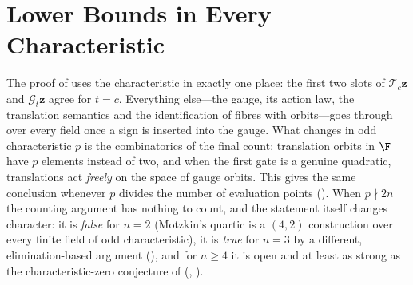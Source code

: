 %

\section{Lower Bounds in Every Characteristic}
\label{sec:lower-charp}

The proof of  uses the characteristic in exactly one place: the
first two slots of $\mathcal T_c\mathbf z$ and $\mathcal G_t\mathbf z$ agree for $t=c$.
Everything else---the gauge, its action law, the translation semantics and the
identification of fibres with orbits---goes through over every field once a sign is
inserted into the gauge.  What changes in odd characteristic $p$ is the combinatorics of
the final count: translation orbits in $\F$ have $p$ elements instead of two, and when the
first gate is a genuine quadratic, translations act \emph{freely} on the space of gauge
orbits.  This gives the same conclusion whenever $p$ divides the number of evaluation
points ().  When $p\nmid 2n$ the counting argument has nothing to
count, and the statement itself changes character: it is \emph{false} for $n=2$ (Motzkin's
quartic is a $(4,2)$ construction over every finite field of odd characteristic), it is
\emph{true} for $n=3$ by a different, elimination-based argument (),
and for $n\ge4$ it is open and at least as strong as the characteristic-zero conjecture of
 (, ).

